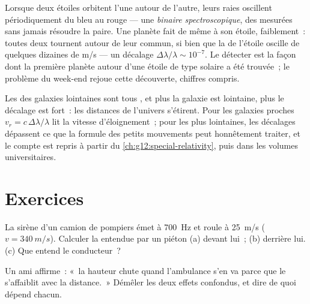 \begin{example}\label{ex:g12:doppler-effect:wobble}
Lorsque deux étoiles orbitent l'une autour de l'autre,
leurs raies oscillent périodiquement du bleu au rouge --- une
\emph{binaire spectroscopique}, des
 mesurées sans jamais résoudre la paire. Une planète
fait de même à son étoile, faiblement~: toutes deux tournent autour
de leur  commun, si bien que la
 de l'étoile oscille de quelques dizaines
de \unit{m/s} --- un décalage $\Delta\lambda/\lambda \sim 10^{-7}$.
Le détecter est la façon dont la première planète autour d'une étoile
de type solaire a été trouvée~; le problème du week-end rejoue cette
découverte, chiffres compris.
\end{example}

\begin{remark}\label{rem:g12:doppler-effect:expansion}
Les  des galaxies lointaines sont tous \emph{}, et plus la galaxie est lointaine, plus le décalage est fort~:
les distances de l'univers s'étirent. Pour les galaxies proches
$v_r = c\,\Delta\lambda/\lambda$ lit la vitesse d'éloignement~; pour
les plus lointaines, les décalages dépassent ce que la formule des
petits mouvements peut honnêtement traiter, et le compte est repris
à partir du \cref{ch:g12:special-relativity}, puis dans les volumes
universitaires.
\end{remark}

\section{Exercices}

\begin{exercise}[$\star$]\label{exo:g12:doppler-effect:1}
La sirène d'un camion de pompiers émet à \qty{700}{Hz} et roule à
\qty{25}{m/s} ($v = \qty{340}{m/s}$). Calculer la
 entendue par un piéton (a) devant lui~; (b)
derrière lui. (c) Que entend le conducteur~?
\end{exercise}

\begin{exercise}[$\star$]\label{exo:g12:doppler-effect:2}
Un ami affirme~: «~la hauteur chute quand l'ambulance s'en
va parce que le  s'affaiblit avec la distance.~» Démêler
les deux effets confondus, et dire de quoi dépend chacun.
\end{exercise}


